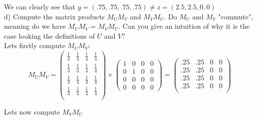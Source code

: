 \documentclass[12pt,twoside]{article}
\begin{document}
We can clearly see that $y=(.75,.75,.75,.75) \neq z = (2.5,2.5,0,0)$ \\



d) Compute the matrix products $M_U M_V$ and $M_V M_U$. Do $M_U$ and $M_V$ "commute", meaning do we have $M_U M_V = M_V M_U$. Can you give an intuition of why it is the case looking the definitions of $U$ and $V$?
\\

Lets firstly compute $M_U M_V$:
$$
    M_UM_V =  \begin{pmatrix}
        \frac{1}{4} & \frac{1}{4} & \frac{1}{4} & \frac{1}{4} \\
        \frac{1}{4} & \frac{1}{4} & \frac{1}{4} & \frac{1}{4} \\
        \frac{1}{4} & \frac{1}{4} & \frac{1}{4} & \frac{1}{4} \\
        \frac{1}{4} & \frac{1}{4} & \frac{1}{4} & \frac{1}{4} \\
    \end{pmatrix} \times    \begin{pmatrix}
    1 & 0 & 0 & 0\\
    0 & 1 & 0 & 0\\
    0 & 0 & 0 & 0\\
    0 & 0 & 0 & 0 
    \end{pmatrix} = 
    \begin{pmatrix}
    .25 & .25 & 0 & 0\\
    .25 & .25 & 0 & 0\\
    .25 & .25 & 0 & 0\\
    .25 & .25 & 0 & 0\\
    \end{pmatrix}
$$

Lets now compute $M_V M_U$
\end{document}
